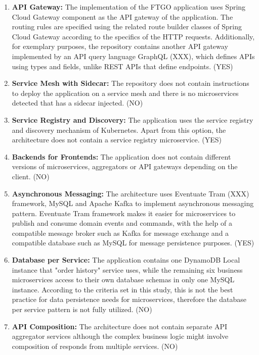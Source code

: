 \documentclass{Configuration_Files/PoliMi3i_thesis}
\begin{document}
\begin{enumerate}
    \item \textbf{API Gateway:} The implementation of the FTGO application uses Spring Cloud Gateway component as the API gateway of the application.
    The routing rules are specified using the related route builder classes of Spring Cloud Gateway according to the specifics of the HTTP requests.
    Additionally, for exemplary purposes, the repository contains another API gateway implemented by an API query language GraphQL (XXX), which defines APIs using types and fields, unlike REST APIs that define endpoints. (YES)
    
    \item \textbf{Service Mesh with Sidecar:} The repository does not contain instructions to deploy the application on a service mesh and there is no microservices detected that has a sidecar injected. (NO)
    
    \item \textbf{Service Registry and Discovery:} The application uses the service registry and discovery mechanism of Kubernetes.
    Apart from this option, the architecture does not contain a service registry microservice. (YES)
    
    \item \textbf{Backends for Frontends:} The application does not contain different versions of microservices, aggregators or API gateways depending on the client. (NO)
    
    \item \textbf{Asynchronous Messaging:} The architecture uses Eventuate Tram (XXX) framework, MySQL and Apache Kafka to implement asynchronous messaging pattern.
    Eventuate Tram framework makes it easier for microservices to publish and consume domain events and commands, with the help of a compatible message broker such as Kafka for message exchange and a compatible database such as MySQL for message persistence purposes. (YES)
    
    \item \textbf{Database per Service:} The application contains one DynamoDB Local instance that "order history" service uses, while the remaining six business microservices access to their own database schemas in only one MySQL instance.
    According to the criteria set in this study, this is not the best practice for data persistence needs for microservices, therefore the database per service pattern is not fully utilized. (NO)
    
    \item \textbf{API Composition:} The architecture does not contain separate API aggregator services although the complex business logic might involve composition of responds from multiple services. (NO)
    

\end{enumerate}
\end{document}
